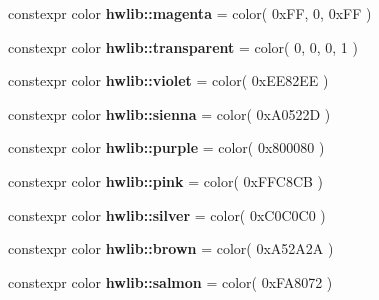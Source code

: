 \begin{DoxyCompactItemize}
\item 
constexpr color {\bfseries hwlib\+::magenta} = color( 0x\+F\+F, 0, 0x\+F\+F )\hypertarget{hwlib-graphics_8hpp_aa4d44b5166927127648eeae921596181}{}\label{hwlib-graphics_8hpp_aa4d44b5166927127648eeae921596181}

\item 
constexpr color {\bfseries hwlib\+::transparent} = color( 0, 0, 0, 1 )\hypertarget{hwlib-graphics_8hpp_a5f2e4acc938c57f1e6030e0656510c21}{}\label{hwlib-graphics_8hpp_a5f2e4acc938c57f1e6030e0656510c21}

\item 
constexpr color {\bfseries hwlib\+::violet} = color( 0x\+E\+E82\+E\+E )\hypertarget{hwlib-graphics_8hpp_a598c038a15212ae56dd81d9708d8a692}{}\label{hwlib-graphics_8hpp_a598c038a15212ae56dd81d9708d8a692}

\item 
constexpr color {\bfseries hwlib\+::sienna} = color( 0x\+A0522\+D )\hypertarget{hwlib-graphics_8hpp_a02e4f7453a14dadbabef58265598fef8}{}\label{hwlib-graphics_8hpp_a02e4f7453a14dadbabef58265598fef8}

\item 
constexpr color {\bfseries hwlib\+::purple} = color( 0x800080 )\hypertarget{hwlib-graphics_8hpp_aba67bcd5e03f50432e45dc75fe432d46}{}\label{hwlib-graphics_8hpp_aba67bcd5e03f50432e45dc75fe432d46}

\item 
constexpr color {\bfseries hwlib\+::pink} = color( 0x\+F\+F\+C8\+C\+B )\hypertarget{hwlib-graphics_8hpp_a2c264d06505f223a3028b1790394849a}{}\label{hwlib-graphics_8hpp_a2c264d06505f223a3028b1790394849a}

\item 
constexpr color {\bfseries hwlib\+::silver} = color( 0x\+C0\+C0\+C0 )\hypertarget{hwlib-graphics_8hpp_a7d764d6d86f662651b76e55da87b5c8f}{}\label{hwlib-graphics_8hpp_a7d764d6d86f662651b76e55da87b5c8f}

\item 
constexpr color {\bfseries hwlib\+::brown} = color( 0x\+A52\+A2\+A )\hypertarget{hwlib-graphics_8hpp_ad3126003784f3b5235989591d8264c0d}{}\label{hwlib-graphics_8hpp_ad3126003784f3b5235989591d8264c0d}

\item 
constexpr color {\bfseries hwlib\+::salmon} = color( 0x\+F\+A8072 )\hypertarget{hwlib-graphics_8hpp_ad15ba22024321378147c49e5dc17cad2}{}\label{hwlib-graphics_8hpp_ad15ba22024321378147c49e5dc17cad2}

\end{DoxyCompactItemize}


